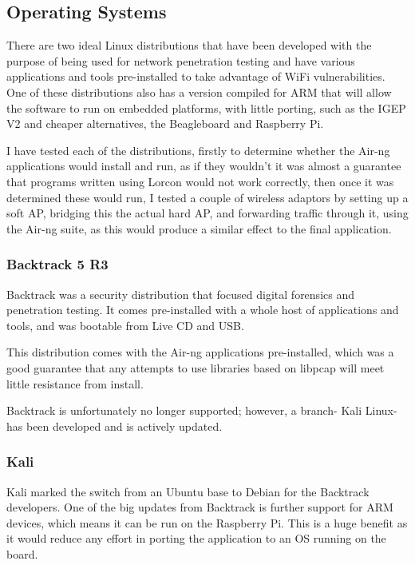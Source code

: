 \subsection{Operating Systems}
There are two ideal Linux distributions that have been developed with the purpose of being used for network penetration testing and have various applications and tools pre-installed to take advantage of WiFi vulnerabilities. One of these distributions also has a version compiled for ARM that will allow the software to run on embedded platforms, with little porting, such as the IGEP V2 and cheaper alternatives, the Beagleboard and Raspberry Pi.

 I have tested each of the distributions, firstly to determine whether the Air-ng applications would install and run, as if they wouldn’t it was almost a guarantee that programs written using Lorcon would not work correctly, then once it was determined these would run, I tested a couple of wireless adaptors by setting up a soft AP, bridging this the actual hard AP, and forwarding traffic through it, using the Air-ng suite, as this would produce a similar effect to the final application.

\subsubsection{Backtrack 5 R3}
Backtrack was a security distribution that focused digital forensics and penetration testing. It comes pre-installed with a whole host of applications and tools, and was bootable from Live CD and USB. 

This distribution comes with the Air-ng applications pre-installed, which was a good guarantee that any attempts to use libraries based on libpcap will meet little resistance from install.

Backtrack is unfortunately no longer supported; however, a branch- Kali Linux- has been developed and is actively updated.
\subsubsection{Kali}
Kali marked the switch from an Ubuntu base to Debian for the Backtrack developers. One of the big updates from Backtrack is further support for ARM devices, which means it can be run on the Raspberry Pi. This is a huge benefit as it would reduce any effort in porting the application to an OS running on the board.
